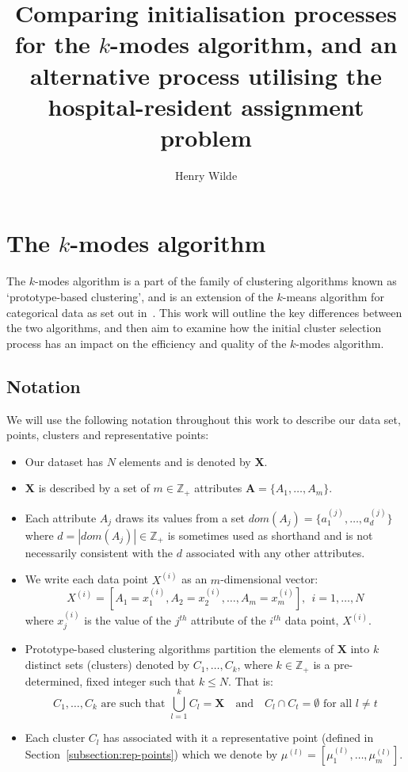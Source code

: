 \documentclass{article}
\title{Comparing initialisation processes for the \(k\)-modes algorithm, and an 
	alternative process utilising the hospital-resident assignment problem}
\author{Henry Wilde}
\theoremstyle{definition}
\begin{document}
\maketitle


\section{The \(k\)-modes algorithm}\label{section:kmodes}

The \(k\)-modes algorithm is a part of the family of clustering algorithms known 
as `prototype-based clustering', and is an extension of the \(k\)-means 
algorithm for categorical data as set out in~\cite{Huang98}. This work will 
outline the key differences between the two algorithms, and then aim to 
examine how the initial cluster selection process has an impact on the 
efficiency and quality of the \(k\)-modes algorithm.\\


\subsection{Notation}\label{subsection:notation}

We will use the following notation throughout this work to describe our data 
set, points, clusters and representative points:

\begin{itemize}
    \item Our dataset has \(N\) elements and is denoted by \textbf{X}.
    \item \textbf{X} is described by a set of \(m \in \mathbb{Z}_+\) attributes 
        \(\textbf{A} = \{A_1, \ldots, A_m\}\).
    \item Each attribute \(A_j\) draws its values from a set \(dom(A_j) = 
        \{a_1^{(j)}, \ldots, a_d^{(j)}\}\) where \(d = |dom(A_j)| \in 
        \mathbb{Z}_+\) is sometimes used as shorthand and is not necessarily 
        consistent with the \(d\) associated with any other attributes.
    \item We write each data point \(X^{(i)}\) as an \(m\)-dimensional vector:
	\[
		X^{(i)} = [A_1 = x_1^{(i)}, A_2 = x_2^{(i)}, \ldots, A_m = 
				x_m^{(i)}], \ \ i=1, \ldots, N
	\]
        where \(x_j^{(i)}\) is the value of the \(j^{th}\) attribute of the
        \(i^{th}\) data point, \(X^{(i)}\).
	\item Prototype-based clustering algorithms partition the elements of 
        \(\textbf{X}\) into \(k\) distinct sets (clusters) denoted by \(C_1, 
        \ldots, C_k\), where \(k \in \mathbb{Z}_+\) is a pre-determined, fixed 
        integer such that \(k \le N\). That is:
	\[
		C_1, \ldots, C_k \text{ are such that } \bigcup_{l=1}^k C_l = 
		\textbf{X} \quad \text{and} \quad C_l \cap C_t = \emptyset 
		\text{ for all } l \ne t
	\]
    \item Each cluster \(C_l\) has associated with it a representative point 
		(defined in Section~\ref{subsection:rep-points}) which we denote by 
        \(\mu^{(l)} = [\mu_1^{(l)}, \ldots, \mu_m^{(l)}]\).
\end{itemize}
\end{document}
